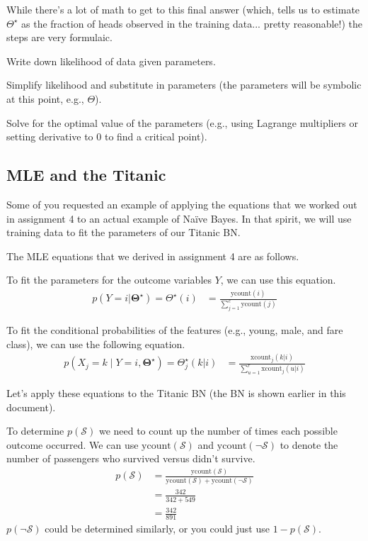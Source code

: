 \documentclass{tufte-handout}
\begin{document}
While there's a lot of math to get to this final answer (which, tells us to estimate $\Theta^\star$ as the fraction of heads observed in the training data... pretty reasonable!) the steps are very formulaic.
\be
\item Write down likelihood of data given parameters.
\item Simplify likelihood and substitute in parameters (the parameters will be symbolic at this point, e.g., $\Theta$).
\item Solve for the optimal value of the parameters (e.g., using Lagrange multipliers or setting derivative to 0 to find a critical point).
\ee

\subsection{MLE and the Titanic}

Some of you requested an example of applying the equations that we worked out in assignment 4 to an actual example of Na\"ive Bayes.  In that spirit, we will use training data to fit the parameters of our Titanic BN.


The MLE equations that we derived in assignment 4 are as follows.

\bi
\item To fit the parameters for the outcome variables $Y$, we can use this equation.
\begin{align}
p(Y=i |  \mathbf{\Theta^\star}) = \Theta^\star(i) &= \frac{\mbox{ycount}(i)}{\sum_{j=1}^c \mbox{ycount}(j)}
\end{align}
\item  To fit the conditional probabilities of the features (e.g., young, male, and fare class), we can use the following equation.
\begin{align}
p(X_j = k \mid Y=i , \mathbf{\Theta^\star}) = \Theta_j^\star(k|i) &= \frac{\mbox{xcount}_j(k|i)}{\sum_{u=1}^r \mbox{xcount}_j(u|i)}
\end{align}
\ei

Let's apply these equations to the Titanic BN (the BN is shown earlier in this document).

\bi
\item To determine $p(\mathcal{S})$ we need to count up the number of times each possible outcome occurred.  We can use $\mbox{ycount}(\mathcal{S})$ and  $\mbox{ycount}(\neg \mathcal{S})$ to denote the number of passengers who survived versus didn't survive.
\begin{align}
p(\mathcal{S}) &= \frac{\mbox{ycount}(\mathcal{S})}{\mbox{ycount}(\mathcal{S}) + \mbox{ycount}(\neg \mathcal{S})} \nonumber \\
&= \frac{342}{342+549} \nonumber \\
&= \frac{342}{891} \nonumber
\end{align}
$p(\neg \mathcal{S})$ could be determined similarly, or you could just use $1-p(\mathcal{S})$.
\end{document}
